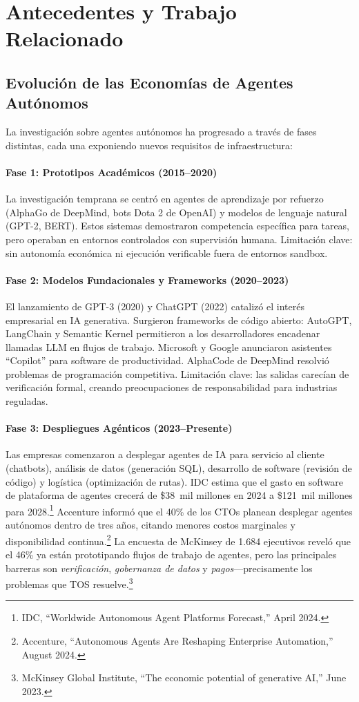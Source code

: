 \documentclass[11pt]{article}
\begin{document}
\section{Antecedentes y Trabajo Relacionado}
\subsection{Evolución de las Economías de Agentes Autónomos}
La investigación sobre agentes autónomos ha progresado a través de fases distintas, cada una exponiendo nuevos requisitos de infraestructura:

\paragraph{Fase 1: Prototipos Académicos (2015--2020)} La investigación temprana se centró en agentes de aprendizaje por refuerzo (AlphaGo de DeepMind, bots Dota 2 de OpenAI) y modelos de lenguaje natural (GPT-2, BERT). Estos sistemas demostraron competencia específica para tareas, pero operaban en entornos controlados con supervisión humana. Limitación clave: sin autonomía económica ni ejecución verificable fuera de entornos sandbox.

\paragraph{Fase 2: Modelos Fundacionales y Frameworks (2020--2023)} El lanzamiento de GPT-3 (2020) y ChatGPT (2022) catalizó el interés empresarial en IA generativa. Surgieron frameworks de código abierto: AutoGPT, LangChain y Semantic Kernel permitieron a los desarrolladores encadenar llamadas LLM en flujos de trabajo. Microsoft y Google anunciaron asistentes ``Copilot'' para software de productividad. AlphaCode de DeepMind resolvió problemas de programación competitiva. Limitación clave: las salidas carecían de verificación formal, creando preocupaciones de responsabilidad para industrias reguladas.

\paragraph{Fase 3: Despliegues Agénticos (2023--Presente)} Las empresas comenzaron a desplegar agentes de IA para servicio al cliente (chatbots), análisis de datos (generación SQL), desarrollo de software (revisión de código) y logística (optimización de rutas). IDC estima que el gasto en software de plataforma de agentes crecerá de \$38~mil millones en 2024 a \$121~mil millones para 2028.\footnote{IDC, ``Worldwide Autonomous Agent Platforms Forecast,'' April 2024.} Accenture informó que el 40\% de los CTOs planean desplegar agentes autónomos dentro de tres años, citando menores costos marginales y disponibilidad continua.\footnote{Accenture, ``Autonomous Agents Are Reshaping Enterprise Automation,'' August 2024.} La encuesta de McKinsey de 1.684 ejecutivos reveló que el 46\% ya están prototipando flujos de trabajo de agentes, pero las principales barreras son \emph{verificación}, \emph{gobernanza de datos} y \emph{pagos}---precisamente los problemas que TOS resuelve.\footnote{McKinsey Global Institute, ``The economic potential of generative AI,'' June 2023.}
\end{document}
